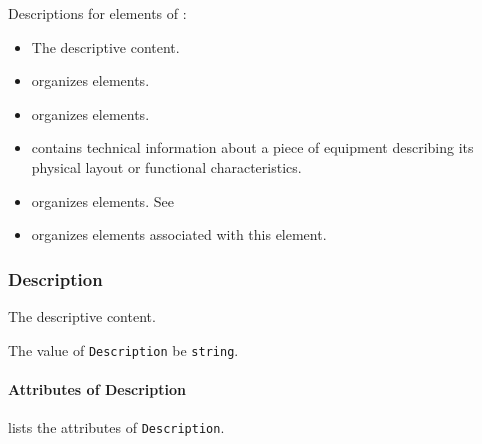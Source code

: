Descriptions for elements of :

\begin{itemize}

\item {} \newline The descriptive content.

\item {} \newline {} \glspl{organize}  elements.

\item {} \newline {} \glspl{organize}  elements.

\item {} \newline {} contains technical information about a piece of equipment describing its physical layout or functional characteristics.

\item {} \newline {} \glspl{organize}  elements. See 

\item {} \newline {} \glspl{organize}  elements associated with this  element.
\end{itemize}



\subsubsection{Description}
\label{sec:Description}



The descriptive content.


The value of \texttt{Description} \MUST be \texttt{string}.


\paragraph{Attributes of Description}\mbox{}
\label{sec:Attributes of Description}

 lists the attributes of \texttt{Description}.

